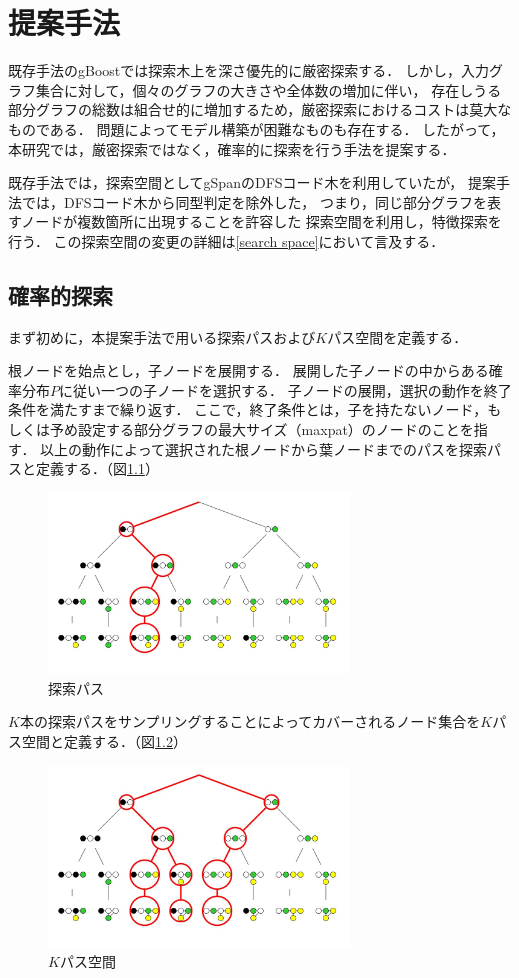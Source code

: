 \chapter{提案手法}
既存手法のgBoostでは探索木上を深さ優先的に厳密探索する．
しかし，入力グラフ集合に対して，個々のグラフの大きさや全体数の増加に伴い，
存在しうる部分グラフの総数は組合せ的に増加するため，厳密探索におけるコストは莫大なものである．
問題によってモデル構築が困難なものも存在する．
したがって，本研究では，厳密探索ではなく，確率的に探索を行う手法を提案する．

既存手法では，探索空間としてgSpan\cite{gSpan}のDFSコード木を利用していたが，
提案手法では，DFSコード木から同型判定を除外した，
つまり，同じ部分グラフを表すノードが複数箇所に出現することを許容した
探索空間を利用し，特徴探索を行う．
この探索空間の変更の詳細は\ref{search space}において言及する．

\section{確率的探索}
まず初めに，本提案手法で用いる探索パスおよび$K$パス空間を定義する．
\begin{Definition}[探索パス]
	根ノードを始点とし，子ノードを展開する．
	展開した子ノードの中からある確率分布$P$に従い一つの子ノードを選択する．
	子ノードの展開，選択の動作を終了条件を満たすまで繰り返す．
	ここで，終了条件とは，子を持たないノード，もしくは予め設定する部分グラフの最大サイズ（maxpat）のノードのことを指す．
	以上の動作によって選択された根ノードから葉ノードまでのパスを探索パスと定義する．（図\ref{path}）
	\begin{figure}[t]
		\centering
		\includegraphics[width=80mm]{figure/red1.jpg}
		\caption{探索パス}
		\label{path}
	\end{figure}
\end{Definition}
\begin{Definition}[$K$パス空間]
	$K$本の探索パスをサンプリングすることによってカバーされるノード集合を$K$パス空間と定義する．（図\ref{area}）
	\begin{figure}[t]
		\centering
		\includegraphics[width=80mm]{figure/red.jpg}
		\caption{$K$パス空間}
		\label{area}
	\end{figure}
\end{Definition}

